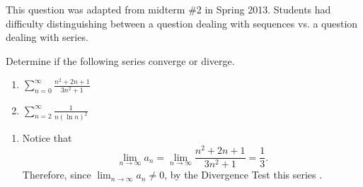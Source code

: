 \documentclass[noinstructornotes]{ximera}
\begin{document}
\begin{instructorNotes}
This question was adapted from midterm \#2 in Spring 2013.  
Students had difficulty distinguishing between a question dealing with sequences vs. a question dealing with series.
\end{instructorNotes}





\begin{problem}
Determine if the following series converge or diverge.
	\begin{enumerate}
%	
%	
%	
	\item  $\sum_{n=0}^\infty \frac{n^2 + 2n + 1}{3n^2 +1}$
%	
	\item  $\sum_{n=2}^\infty \frac{1}{n(\ln n)^2}$
%	
%	
	\end{enumerate}
%	
	\begin{freeResponse}
		\begin{enumerate}
%	
%		
%		
%	
%		
%		
%		
%	
		\item  {}
		
		Notice that
			\[
			\lim_{n \to \infty} a_n = \lim_{n \to \infty} \frac{n^2 + 2n + 1}{3n^2 +1} = \frac{1}{3}.
			\]
		Therefore, since $\lim_{n \to \infty} a_n \neq 0$, by the Divergence Test this series .
		

\end{enumerate}
\end{freeResponse}
\end{problem}
\end{document}
